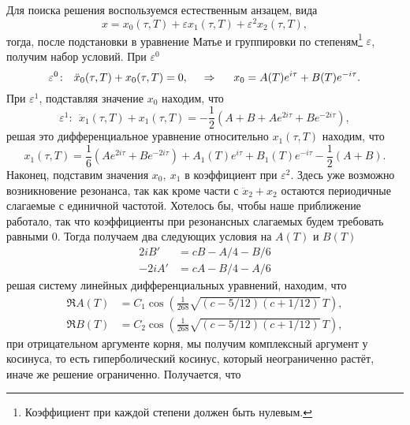 Для поиска решения воспользуемся естественным анзацем, вида
\begin{equation*}
    x = x_0(\tau, T) + \varepsilon x_1 (\tau, T) + \varepsilon^2 x_2 (\tau, T),
\end{equation*}
тогда, после подстановки в уравнение Матье и группировки по степеням\footnote{
    Коэффициент при каждой степени должен быть нулевым.
}  $\varepsilon$, получим набор условий. При $\varepsilon^0$
\begin{equation*}
    \varepsilon^0 \colon \ \ \ddot{x}_0(\tau, T) +  x_0(\tau, T) = 0,
    \hspace{0.5cm} \Rightarrow \hspace{0.5cm}
    x_0 = A(T) e^{i\tau} + B(T) e^{-i\tau}.
\end{equation*}
При $\varepsilon^1$, подставляя значение $x_0$ находим, что
\begin{equation*}
    \varepsilon^1 \colon \ \ \ddot{x}_1(\tau, T) +  x_1(\tau, T) 
    = -\frac{1}{2}\left(
        A+B + A e^{2 i \tau} + B e^{- 2 i \tau}
    \right)
    ,
\end{equation*}
решая это дифференциальное уравнение относительно $x_1(\tau, T)$ находим, что
\begin{equation*}
    x_1(\tau, T) = \frac{1}{6} (Ae^{2 i \tau} + B e^{-2 i \tau}) + 
    A_1(T) e^{i \tau} + B_1(T) e^{-i \tau} - \frac{1}{2}(A+B).
\end{equation*}
Наконец, подставим значения $x_0,\ x_1$ в коэффициент при $\varepsilon^2$. Здесь уже возможно возникновение резонанса, так как кроме части с $\ddot{x}_2 + x_2$ остаются периодичные слагаемые с единичной частотой. Хотелось бы, чтобы наше приближение работало, так что коэффициенты при резонансных слагаемых будем требовать равными 0. Тогда получаем два следующих условия на $A(T)$ и $B(T)$ 
\begin{align*}
    2 i B' &= c B - A/4 - B/6 \\
    -2 i A' &= c A - B/4 - A/6
\end{align*}
решая систему линейных дифференциальных уравнений, находим, что
\begin{align*}
    \Re A(T) &= C_1 \cos\left(
        \frac{1}{268} \sqrt{(c - 5/12)(c+1/12)}\, T
    \right), \\
    \Re B(T) &= C_2 \cos\left(
        \frac{1}{268} \sqrt{(c - 5/12)(c+1/12)}\, T
    \right),
\end{align*}
при отрицательном аргументе корня, мы получим комплексный аргумент у косинуса, то есть гиперболический косинус, который неограниченно растёт, иначе же решение ограниченно. Получается, что
